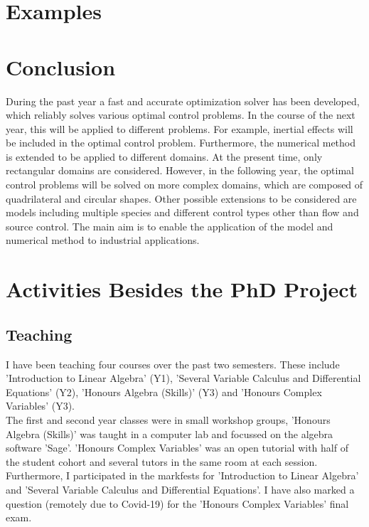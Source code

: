 \documentclass[11pt, a4paper]{article}
\theoremstyle{definition}
\begin{document}
\section{Examples}



\section{Conclusion}
During the past year a fast and accurate optimization solver has been developed, which reliably solves various optimal control problems. In the course of the next year, this will be applied to different problems. For example, inertial effects will be included in the optimal control problem. Furthermore, the numerical method is extended to be applied to different domains. At the present time, only rectangular domains are considered. However, in the following year, the optimal control problems will be solved on more complex domains, which are composed of quadrilateral and circular shapes. 
Other possible extensions to be considered are models including multiple species and different control types other than flow and source control.
The main aim is to enable the application of the model and numerical method to industrial applications.


\pagebreak	



\pagebreak
\appendix

\section{Activities Besides the PhD Project}
\subsection{Teaching}
I have been teaching four courses over the past two semesters. These include 'Introduction to Linear Algebra' (Y1), 'Several Variable Calculus and Differential Equations' (Y2), 'Honours Algebra (Skills)' (Y3) and 'Honours Complex Variables' (Y3).\\
The first and second year classes were in small workshop groups, 'Honours Algebra (Skills)' was taught in a computer lab and focussed on the algebra software 'Sage'. 'Honours Complex Variables' was an open tutorial with half of the student cohort and several tutors in the same room at each session.\\
Furthermore, I participated in the markfests for 'Introduction to Linear Algebra' and 'Several Variable Calculus and Differential Equations'. I have also marked a question (remotely due to Covid-19) for the 'Honours Complex Variables' final exam.
\end{document}
